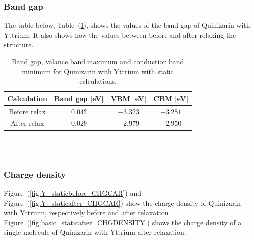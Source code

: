 \documentclass{article}
\begin{document}
      \vspace{1cm}

    \subsubsection{Band gap}

      The table below, Table~(\ref{tab:bandgapY}), shows the values of the band gap of Quinizarin with Yttrium. It also shows how the values between before and after relaxing the structure. \\

      \begin{table}[H]
        \centering
        \caption{Band gap, valance band maximum and conduction band minimum for Quinizarin with Yttrium with static calculations. }
        \vspace{0mm}
        \label{tab:bandgapY}
        \begin{tabular}{|c|c|c|c|}
            \hline
            Calculation & Band gap [eV] & VBM [eV] & CBM [eV]  \\
            \hline \hline
            Before relax & $0.042$ & $-3.323$ & $-3.281$ \\
            After relax & $0.029$ & $-2.979$ & $-2.950$ \\
            \hline
        \end{tabular} \\
        \hspace{0pt}\\
      \end{table}

      \vspace{1cm}

    \subsubsection{Charge density}

      Figure~(\ref{fig:Y_staticbefore_CHGCAR}) and Figure~(\ref{fig:Y_staticafter_CHGCAR}) show the charge density of Quinizarin with Yttrium, respectively before and after relaxation. Figure~(\ref{fig:basic_staticafter_CHGDENSITY}) shows the charge density of a single molecule of Quinizarin with Yttrium after relaxation. \\
\end{document}

